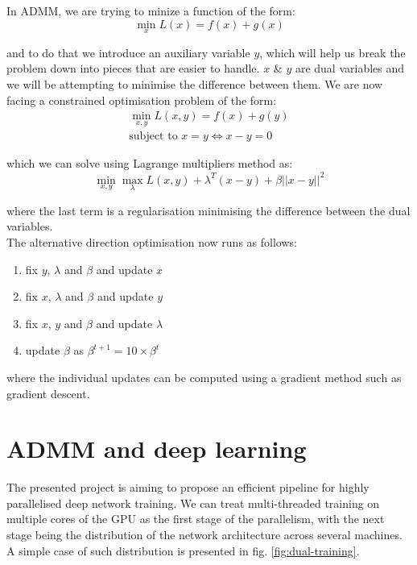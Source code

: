 \documentclass[a4paper, 11pt]{article}
\numberwithin{equation}{section}
\begin{document}
		In ADMM, we are trying to minize a function of the form:
		\begin{equation}
		\min_{x} L(x) = f(x) + g(x)
		\end{equation}
		
		and to do that we introduce an auxiliary variable $y$, which will help us break the problem down into pieces that are easier to handle. $x$ \& $y$ are dual variables and we will be attempting to minimise the difference between them. We are now facing a constrained optimisation problem of the form:
		\begin{align}
		\min_{x,y} L(x,y) = f(x) + g(y) \\
		\textrm{subject to } x = y \Leftrightarrow x-y=0
		\end{align}
		
		which we can solve using Lagrange multipliers method as:
		\begin{equation}
		\label{ADMM_equation}
		\min_{x,y} \max_{\lambda} L(x,y) + \lambda^T (x-y) + \beta ||x-y||^2
		\end{equation}
		
		where the last term is a regularisation minimising the difference between the dual variables. \\
		
		The alternative direction optimisation now runs as follows:
		\begin{enumerate}
		\item fix $y$, $\lambda$ and $\beta$ and update $x$
		\item fix $x$, $\lambda$ and $\beta$ and update $y$
		\item fix $x$, $y$ and $\beta$ and update $\lambda$
		\item update $\beta$ as $\beta^{t+1}=10 \times \beta^{t}$
		\end{enumerate} 
		
		where the individual updates can be computed using a gradient method such as gradient descent.
		
		\section{ADMM and deep learning}
		
		The presented project is aiming to propose an efficient pipeline for highly parallelised deep network training. We can treat multi-threaded training on multiple cores of the GPU as the first stage of the parallelism, with the next stage being the distribution of the network architecture across several machines. A simple case of such distribution is presented in fig. \ref{fig:dual-training}.
		
\end{document}
